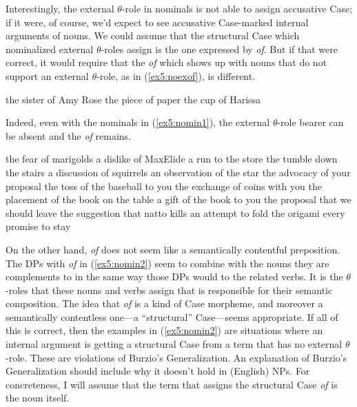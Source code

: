 Interestingly, the external $\theta$-role in nominals is not able to assign accusative Case; if it were, of course, we'd expect to see accusative Case-marked internal arguments of nouns. We could assume that the structural Case which nominalized external $\theta$-roles assign is the one expressed by \emph{of}. But if that were correct, it would require that the \emph{of} which shows up with nouns that do not support an external $\theta$-role, as in (\ref{ex5:noexof}), is different.
\begin{exe}
	\raggedright
	\ex \label{ex5:noexof} 
	\begin{xlist}
		\ex the sister of Amy Rose
		\ex the piece of paper
		\ex the cup of Harissa 
	\end{xlist}
\end{exe}
Indeed, even with the nominals in (\ref{ex5:nomin1}), the external $\theta$-role bearer can be absent and the \emph{of} remains.
\begin{exe}
	\raggedright
	\ex \label{ex5:nomin2} 
	\begin{xlist}
		\ex the fear of marigolds
		\ex a dislike of MaxElide
		\ex a run to the store
		\ex the tumble down the stairs
		\ex a discussion of squirrels
		\ex an observation of the star
		\ex the advocacy of your proposal
		\ex the toss of the baseball to you
		\ex the exchange of coins with you
		\ex the placement of the book on the table
		\ex a gift of the book to you
		\ex the proposal that we should leave
		\ex the suggestion that natto kills
		\ex an attempt to fold the origami
		\ex every promise to stay
	\end{xlist}	
\end{exe}
On the other hand, \emph{of} does not seem like a semantically contentful preposition. The DPs with \emph{of} in (\ref{ex5:nomin2}) seem to combine with the nouns they are complements to in the same way those DPs would to the related verbs. It is the $\theta$-roles that these nouns and verbs assign that is responsible for their semantic composition. The idea that \emph{of} is a kind of Case morpheme, and moreover a semantically contentless one---a ``structural'' Case---seems appropriate. If all of this is correct, then the examples in (\ref{ex5:nomin2}) are situations where an internal argument is getting a structural Case from a term that has no external $\theta$-role. These are violations of Burzio's Generalization. An explanation of Burzio's Generalization should include why it doesn't hold in (English) NPs. For concreteness, I will assume that the term that assigns the structural Case \emph{of} is the noun itself. 


